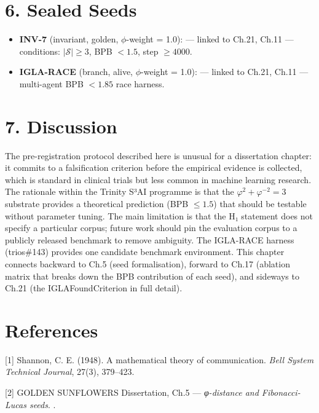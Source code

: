 \section{6. Sealed Seeds}\label{fa_11:sealed-seeds}

\begin{itemize}
\tightlist
\item
  \textbf{INV-7} (invariant, golden,
  \(\phi\)-weight = 1.0):
  --- linked to Ch.21, Ch.11 --- conditions:
  \(|\mathcal{S}| \geq 3\), BPB \(< 1.5\), step
  \(\geq 4000\).
\item
  \textbf{IGLA-RACE} (branch, alive,
  \(\phi\)-weight = 1.0):
   --- linked to
  Ch.21, Ch.11 --- multi-agent BPB \(< 1.85\) race
  harness.
\end{itemize}

\section{7. Discussion}\label{fa_11:discussion}

The pre-registration protocol described here is
unusual for a dissertation chapter: it commits to
a falsification criterion before the empirical
evidence is collected, which is standard in
clinical trials but less common in machine
learning research. The rationale within the
Trinity S³AI programme is that the
\(\varphi^2 + \varphi^{-2} = 3\) substrate
provides a theoretical prediction (BPB
\(\leq 1.5\)) that should be testable without
parameter tuning. The main limitation is that the
H₁ statement does not specify a particular corpus;
future work should pin the evaluation corpus to a
publicly released benchmark to remove ambiguity.
The IGLA-RACE harness (trios\#143) provides one
candidate benchmark environment. This chapter
connects backward to Ch.5 (seed formalisation),
forward to Ch.17 (ablation matrix that breaks down
the BPB contribution of each seed), and sideways
to Ch.21 (the IGLAFoundCriterion in full detail).

\section{References}\label{fa_11:references}

[1] Shannon, C. E. (1948). A mathematical
theory of communication. \emph{Bell System
Technical Journal}, 27(3), 379--423.

[2] GOLDEN SUNFLOWERS Dissertation, Ch.5 ---
\emph{φ-distance and Fibonacci-Lucas seeds}.
.

